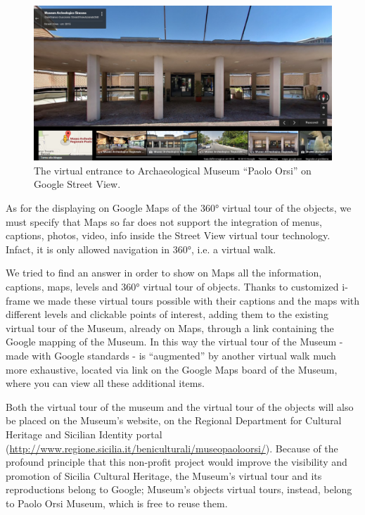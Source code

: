 \documentclass[amsthm,ebook]{saparticle}
\begin{document}
\begin{figure}[!bp]
\centering
 \includegraphics[width=\columnwidth]{EAGLE2016BONACINIPilotprojectatPaoloOrsiMuseum-img001.jpg}
\caption{The virtual entrance to Archaeological Museum ``Paolo Orsi'' on Google Street View. }
\label{fig:1}
\end{figure}


As for the displaying on Google Maps of the 360° virtual tour of the objects, we must specify that Maps so far does not
support the integration of menus, captions, photos, video, info inside the Street View virtual tour technology.
Infact, it is only allowed navigation in 360°, i.e. a virtual walk.

\newpage
We tried to find an answer in order to show on Maps all the information, captions, maps, levels and 360° virtual tour of
objects. Thanks to customized i-frame we made these virtual tours possible with their captions and the maps with
different levels and clickable points of interest, adding them to the existing virtual tour of the Museum, already on
Maps, through a link containing the Google mapping of the Museum. In this way the virtual tour of the Museum - made
with Google standards - is ``augmented'' by another virtual walk much more exhaustive, located via link on the Google
Maps board of the Museum, where you can view all these additional items.

Both the virtual tour of the museum and the virtual tour of the objects will also be placed on the Museum's website, on
the Regional Department for Cultural Heritage and Sicilian Identity portal
(\url{http://www.regione.sicilia.it/beniculturali/museopaoloorsi/}). Because of the profound principle that this non-profit
project would improve the visibility and promotion of Sicilia Cultural Heritage, the Museum’s virtual tour and its
reproductions belong to Google; Museum’s objects virtual tours, instead, belong to Paolo Orsi Museum, which is free to
reuse them. 
\end{document}
